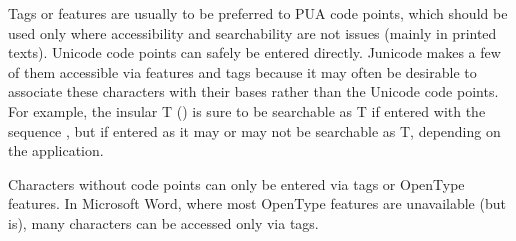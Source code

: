 Tags or  features are usually to be preferred to PUA code points,
which should be used only where accessibility and searchability are
not issues (mainly in printed texts). Unicode code points can safely be
entered directly. Junicode makes a few of them accessible via  features and tags because it may often
be desirable to associate these characters with their bases rather than the Unicode code points. For
example, the insular T () is sure to be searchable as T if entered with the sequence
, but if entered as  it may or may not be searchable as T,
depending on the application.

Characters without code points can only be entered via tags or OpenType features. In Microsoft Word, where most
OpenType features are unavailable (but  is), many characters can be accessed only via tags.

